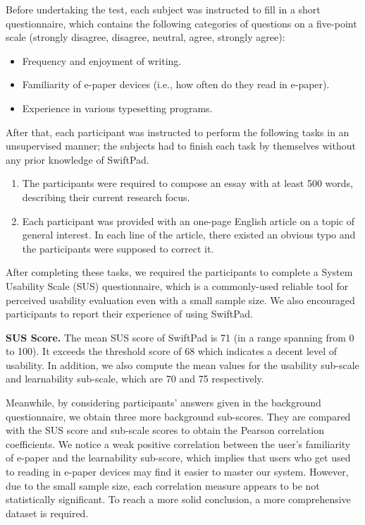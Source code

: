 \documentclass[]{sigchi}
\begin{document}
Before undertaking the test, each subject was instructed to fill in a short questionnaire, which contains the following categories of questions on a five-point scale (strongly disagree, disagree, neutral, agree, strongly agree):
\begin{itemize}
\item Frequency and enjoyment of writing.
\item Familiarity of e-paper devices (i.e., how often do they read in e-paper).
\item Experience in various typesetting programs.
\end{itemize}

After that, each participant was instructed to perform the following tasks in an unsupervised manner; the subjects had to finish each task by themselves without any prior knowledge of SwiftPad.
\begin{enumerate}
	\item The participants were required to compose an essay with at least 500 words, describing their current research focus. 
	\item Each participant was provided with an one-page English article on a topic of general interest. In each line of the article, there existed an obvious typo and the participants were supposed to correct it.
\end{enumerate}

After completing these tasks, we required the participants to complete a System Usability Scale (SUS) questionnaire, which is a commonly-used reliable tool for perceived usability evaluation even with a small sample size.
We also encouraged participants to report their experience of using SwiftPad.

\textbf{SUS Score.}
The mean SUS score of SwiftPad is 71 (in a range spanning from 0 to 100). It exceeds the threshold score of 68 which  indicates a decent level of usability. 
In addition, we also compute the mean values for the usability sub-scale and learnability sub-scale, which are 70 and 75 respectively. 

Meanwhile, by considering participants' answers given in the background questionnaire, we obtain three more background sub-scores.
They are compared with the SUS score and sub-scale scores to obtain the Pearson correlation coefficients. 
We notice a weak positive correlation between the user's familiarity of e-paper and the learnability sub-score, which implies that users who get used to reading in e-paper devices may find it easier to master our system.
However, due to the small sample size, each correlation measure appears to be not statistically significant. To reach a more solid conclusion, a more comprehensive dataset is required.
\end{document}

